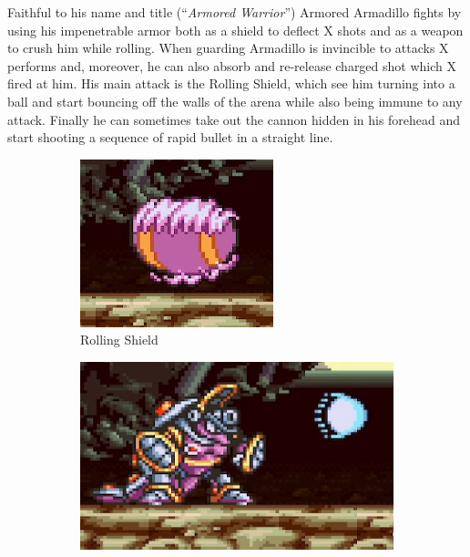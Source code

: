 Faithful to his name and title (``\textit{Armored Warrior}''\cite{book:MMX_Complete_art}) Armored Armadillo fights by using his impenetrable armor both as a shield to deflect X shots and as a weapon to crush him while rolling. When guarding Armadillo is invincible to attacks X performs and, moreover, he can also absorb and re-release charged shot which X fired at him. His main attack is the Rolling Shield, which see him turning into a ball and start bouncing off the walls of the arena while also being immune to any attack. Finally he can sometimes take out the cannon hidden in his forehead and start shooting a sequence of rapid bullet in a straight line.
\begin{figure}[htp]
	\centering
	\begin{subfigure}[t]{0.3\textwidth}
		\centering
		\includegraphics[width=\linewidth]{figures/X1/Armored_armadillo/Armadillo_rolling.jpg}
		\caption{Rolling Shield}
	\end{subfigure}
	\begin{subfigure}[t]{0.4\textwidth}
		\centering
		\includegraphics[width=\linewidth]{figures/X1/Armored_armadillo/Armadillo_cannon.jpg}

\end{subfigure}
\end{figure}
